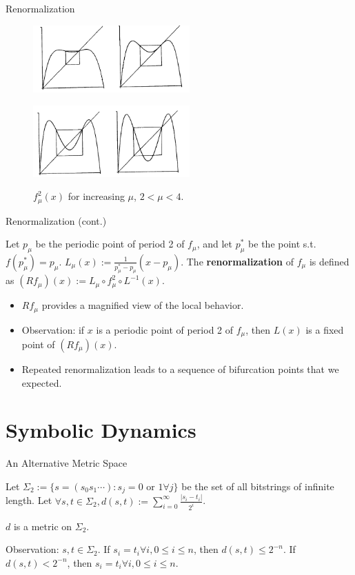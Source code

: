 \documentclass[aspectratio=169]{beamer}
\begin{document}
\begin{frame}{Renormalization}
\begin{figure}[htp]
    \includegraphics[width=6cm]{images/renorm1.png}
    \label{fig:renorm1}
\end{figure}
\begin{figure}[htp]
    \includegraphics[width=6cm]{images/renorm2.png}
    \label{fig:renorm2}
    \caption{$f_\mu^2(x)$ for increasing $\mu$, $2<\mu<4.$}
\end{figure}
\end{frame}

\begin{frame}{Renormalization (cont.)}
\begin{defn}
    Let $p_\mu$ be the periodic point of period 2 of $f_\mu$, and let $p_\mu^*$ be the point s.t. $f(p_\mu^*) = p_\mu$. $L_\mu(x) := \frac{1}{p_\mu^*-p_\mu}(x-p_\mu)$. The \textbf{renormalization} of $f_\mu$ is defined as $(Rf_\mu)(x) := L_\mu\circ f_\mu^2 \circ L^{-1}(x)$. 
\end{defn}
\begin{itemize}
    \item $Rf_\mu$ provides a magnified view of the local behavior.  
    \item Observation: if $x$ is a periodic point of period 2 of $f_\mu$, then $L(x)$ is a fixed point of $(Rf_\mu)(x)$.
    \item Repeated renormalization leads to a sequence of bifurcation points that we expected. 
\end{itemize}
 
\end{frame}

\section{Symbolic Dynamics}
\frame{\sectionpage}

\begin{frame}{An Alternative Metric Space}
\begin{defn}
    Let $\Sigma_2 := \{s = (s_0s_1\cdots) : s_j=0 \text{ or } 1 \forall j\}$ be the set of all bitstrings of infinite length. Let $\forall s,t \in \Sigma_2, d(s,t) := \displaystyle\sum_{i=0}^\infty \frac{|s_i-t_i|}{2^i}$. 
\end{defn}
\begin{prop}
    $d$ is a metric on $\Sigma_2$. 
\end{prop}
Observation: $s,t \in \Sigma_2$. If $s_i=t_i \forall i, 0\leq i\leq n$, then $d(s,t)\leq 2^{-n}$. If $d(s,t)< 2^{-n}$, then $s_i=t_i \forall i, 0\leq i\leq n$. 
\end{frame}
\end{document}
